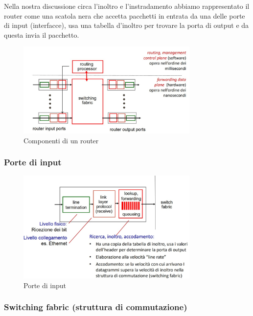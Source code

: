 Nella nostra discussione circa l’inoltro e l’instradamento abbiamo rappresentato il router come una scatola nera che accetta pacchetti in entrata da una delle porte di input (interfacce), usa una tabella d’inoltro per trovare la porta di output e da questa invia il pacchetto.\

\begin{figure}[H]
    \centering
    \includegraphics[width=0.8\textwidth]{immagini/Architettura_router.jpg}
    \caption*{Componenti di un router}
\end{figure}

\subsubsection{Porte di input}

\begin{figure}[H]
    \centering
    \includegraphics[width=0.8\textwidth]{immagini/PorteInput.jpg}
    \caption*{Porte di input}
\end{figure}

\subsubsection{Switching fabric (struttura di commutazione)}


